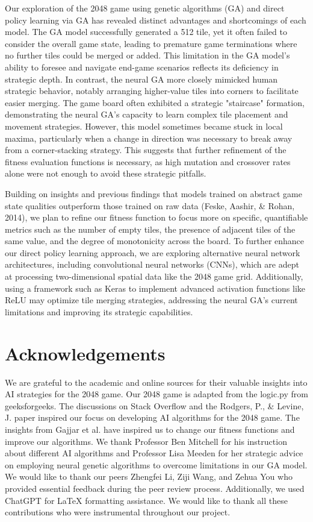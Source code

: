 \documentclass[11pt]{article}
\begin{document}
Our exploration of the 2048 game using genetic algorithms (GA) and direct policy learning via GA has revealed distinct advantages and shortcomings of each model. The GA model successfully generated a 512 tile, yet it often failed to consider the overall game state, leading to premature game terminations where no further tiles could be merged or added. This limitation in the GA model's ability to foresee and navigate end-game scenarios reflects its deficiency in strategic depth. In contrast, the neural GA more closely mimicked human strategic behavior, notably arranging higher-value tiles into corners to facilitate easier merging. The game board often exhibited a strategic "staircase" formation, demonstrating the neural GA's capacity to learn complex tile placement and movement strategies. However, this model sometimes became stuck in local maxima, particularly when a change in direction was necessary to break away from a corner-stacking strategy. This suggests that further refinement of the fitness evaluation functions is necessary, as high mutation and crossover rates alone were not enough to avoid these strategic pitfalls.

Building on insights and previous findings that models trained on abstract game state qualities outperform those trained on raw data (Feske, Aashir, \& Rohan, 2014), we plan to refine our fitness function to focus more on specific, quantifiable metrics such as the number of empty tiles, the presence of adjacent tiles of the same value, and the degree of monotonicity across the board. To further enhance our direct policy learning approach, we are exploring alternative neural network architectures, including convolutional neural networks (CNNs), which are adept at processing two-dimensional spatial data like the 2048 game grid. Additionally, using a framework such as Keras to implement advanced activation functions like ReLU may optimize tile merging strategies, addressing the neural GA's current limitations and improving its strategic capabilities.


\section{Acknowledgements}

We are grateful to the academic and online sources for their valuable insights into AI strategies for the 2048 game. Our 2048 game is adapted from the logic.py from geeksforgeeks. The discussions on Stack Overflow and the Rodgers, P., \& Levine, J. paper inspired our focus on developing AI algorithms for the 2048 game. The insights from Gajjar et al. have inspired us to change our fitness functions and improve our algorithms. We thank Professor Ben Mitchell for his instruction about different AI algorithms and Professor Lisa Meeden for her strategic advice on employing neural genetic algorithms to overcome limitations in our GA model. We would like to thank our peers Zhengfei Li, Ziji Wang, and Zehua You who provided essential feedback during the peer review process. Additionally, we used ChatGPT for LaTeX formatting assistance. We would like to thank all these contributions who were instrumental throughout our project.
\end{document}
